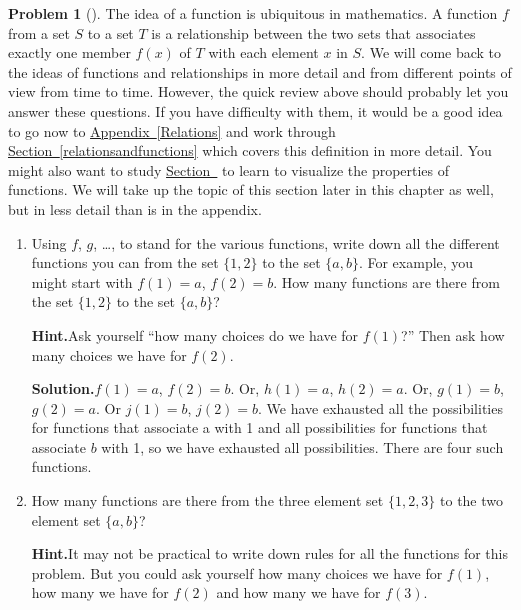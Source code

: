 \documentclass[10pt,]{book}
\theoremstyle{plain}
\theoremstyle{definition}
\newtheorem{activity}[project]{Problem}
\theoremstyle{definition}
\numberwithin{equation}{chapter}
\begin{document}
\begin{activity}[]\label{countingfunctions}
The idea of a function is ubiquitous in mathematics. A function \(f\) from a set \(S\) to a set \(T\) is a relationship between the two sets that associates exactly one member \(f(x)\) of \(T\) with each element \(x\) in \(S\). We will come back to the ideas of functions and relationships in more detail and from different points of view from time to time. However, the quick review above should probably let you answer these questions. If you have difficulty with them, it would be a good idea to go now to \hyperref[Relations]{Appendix~\ref{Relations}} and work through \hyperref[relationsandfunctions]{Section~\ref{relationsandfunctions}} which covers this definition in more detail. You might also want to study \hyperref[digraphsoffunctions]{Section~} to learn to visualize the properties of functions. We will take up the topic of this section later in this chapter as well, but in less detail than is in the appendix.%
\begin{enumerate}[font=\bfseries,label=(\alph*),ref=\alph*]
\item\label{countingfunctionsparta} Using \(f\), \(g\), \dots{}, to stand for the various functions, write down all the different functions you can from the set \(\{1,2\}\) to the set \(\{a,b\}\).  For example, you might start with \(f(1)=a\), \(f(2)=b\).  How many functions are there from the set \(\{1,2\}\) to the set \(\{a,b\}\)?%
\par\medskip\noindent%
\textbf{Hint.}\quad Ask yourself ``how many choices do we have for \(f(1)\)?'' Then ask how many choices we have for \(f(2)\).%
\par\medskip\noindent%
\textbf{Solution.}\quad \(f(1) =a\), \(f(2) = b\). Or, \(h(1) =a\), \(h(2) =a\). Or, \(g(1)=b\), \(g(2) = a\). Or \(j(1) =b\), \(j(2) =b\). We have exhausted all the possibilities for functions that associate a with 1 and all possibilities for functions that associate \(b\) with 1, so we have exhausted all possibilities. There are four such functions.%
\item\label{task-6} How many functions are there from the three element set \(\{1,2,3\}\) to the two element set \(\{a,b\}\)?%
\par\medskip\noindent%
\textbf{Hint.}\quad It may not be practical to write down rules for all the functions for this problem. But you could ask yourself how many choices we have for \(f(1)\), how many we have for \(f(2)\) and how many we have for \(f(3)\).%
\par\medskip\noindent%

\end{enumerate}
\end{activity}
\end{document}
